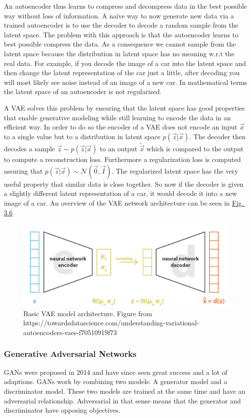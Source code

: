 An autoencoder thus learns to compress and decompress data in the best possible way without loss of information. A na\"{i}ve way to now generate new data via a trained autoencoder is to use the decoder to decode a random sample from the latent space. The problem with this approach is that the autoencoder learns to best possible compress the data. As a consequence we cannot sample from the latent space because the distribution in latent space has no meaning w.r.t the real data. For example, if you decode the image of a car into the latent space and then change the latent representation of the car just a little, after decoding you will most likely see noise instead of an image of a new car. In mathematical terms the latent space of an autoencoder is not regularized.

A VAE solves this problem by ensuring that the latent space has good properties that enable generative modeling while still learning to encode the data in an efficient way. In order to do so the encoder of a VAE does not encode an input $\vec{x}$ to a single value but to a distribution in latent space $p(\vec{z}|\vec{x})$. The decoder then decodes a sample $\vec{z}\sim p(\vec{z}|\vec{x})$ to an output $\tilde{\vec{x}}$ which is compared to the output to compute a reconstruction loss. Furthermore a regularization loss is computed assuring that $p(\vec{z}|\vec{x})\sim\mathcal{N}(\vec{0},\vec{I})$. The regularized latent space has the very useful property that similar data is close together. So now if the decoder is given a slightly different latent representation of a car, it would decode it into a new image of a car. An overview of the VAE network architecture can be seen in \hyperref[fig:3.6]{Fig.\,3.6}
%
\begin{figure} \label{fig:3.6}
    \centering
    \includegraphics[width=.65\textwidth]{Chapters/figures/vae.PNG}
    \caption[Basic VAE model architecture]{Basic VAE model architecture. Figure from\\
    https://towardsdatascience.com/understanding-variational-autoencoders-vaes-f70510919f73}
\end{figure}
%
\subsubsection{Generative Adversarial Networks} \label{sec:gans}
GANs were proposed in 2014 \cite{gan_original} and have since seen great success and a lot of adaptions. GANs work by combining two models: A generator model and a discriminator model. These two models are trained at the same time and have an adversarial relationship. Adversarial in that sense means that the generator and discriminator have opposing objectives. 


